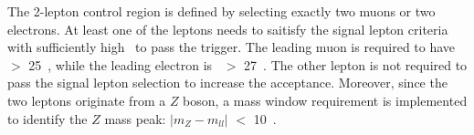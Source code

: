 \par The 2-lepton control region is defined by selecting exactly two muons or two electrons. 
At least one of the leptons needs to saitisfy the signal lepton criteria with sufficiently high \pt~to pass the trigger. 
The leading muon is required to have \pt~$>$ 25~\GeV, while the leading electron is \pt~$>$ 27~\GeV. 
The other lepton is not required to pass the signal lepton selection to increase the acceptance. 
Moreover, since the two leptons originate from a $Z$ boson, a mass window requirement is implemented to identify the $Z$ mass peak: $|m_{Z}-m_{ll}|$ $<$ 10~\GeV.
